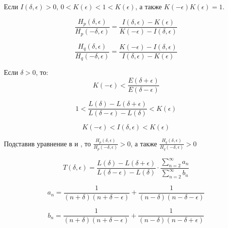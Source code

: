 Если $I(\delta, \epsilon) > 0$, $0 < K(\epsilon) < 1 < K (\epsilon)$, а также $K(- \epsilon)K(\epsilon) = 1$.

\begin{equation}
	\label{eq:equation97}
	\frac{H_{p}(\delta, \epsilon)}{H_{p}(- \delta, \epsilon)} = \frac{I(\delta, \epsilon) - K(\epsilon)}{K(- \epsilon) - I(\delta, \epsilon)}
\end{equation}

\begin{equation}
	\label{eq:equation98}
	\frac{H_{q}(\delta, \epsilon)}{H_{q}(- \delta, \epsilon)} = \frac{K(- \epsilon) -  I(\delta, \epsilon)}{I(\delta, \epsilon) - K(\epsilon)}
\end{equation}

Если $\delta > 0$, то:
\begin{equation}
	\label{eq:equation99}
	K(- \epsilon) < \frac{E(\delta + \epsilon)}{E(\delta - \epsilon)}
\end{equation}

\begin{equation}
	\label{eq:equation100}
	1 < \frac{L(\delta) - L(\delta + \epsilon)}{L(\delta - \epsilon) - L(\delta)} < K(\epsilon)
\end{equation}

\begin{equation}
	\label{eq:equation101}
	K(- \epsilon) < I(\delta, \epsilon) < K(\epsilon)
\end{equation}

Подставив уравнение  в   и  , то $\frac{H_{p}(\delta, \epsilon)}{H_{p}(- \delta, \epsilon)} > 0$, а также $\frac{H_{q}(\delta, \epsilon)}{H_{q}(- \delta, \epsilon)} > 0$

\begin{equation}
	\label{eq:equation102}
	T(\delta,  \epsilon) = \frac{L(\delta) - L(\delta + \epsilon)}{L(\delta - \epsilon) - L(\delta)} \cdot \frac{ \sum_{n = 2}^{\infty} a_{n}}{\sum_{n = 2}^{\infty} b_{n}}
\end{equation}

\begin{equation}
	\label{eq:equation103}
	a_{n} = \frac{1}{(n + \delta)(n + \delta - \epsilon)} + \frac{1}{(n - \delta)(n - \delta - \epsilon)} 
\end{equation}

\begin{equation}
	\label{eq:equation104}
	b_{n} = \frac{1}{(n + \delta)(n + \delta - \epsilon)} + \frac{1}{(n - \delta)(n - \delta + \epsilon)} 
\end{equation}

